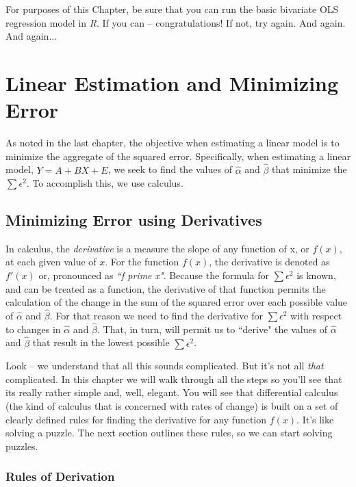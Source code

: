 \documentclass[11pt,openany]{book}\usepackage[]{graphicx}\usepackage[]{color}
\begin{document}
For purposes of this Chapter, be sure that you can run the basic bivariate OLS regression model in \textit{R}. If you can -- congratulations! If not, try again. And again. And again...




\chapter{Linear Estimation and Minimizing Error} 

As noted in the last chapter, the objective when estimating a linear model is to minimize the aggregate of the squared error. Specifically, when estimating a linear model, $Y=A+BX+E$, we seek to find the values of $\hat{\alpha}$ and $\hat{\beta}$ that minimize the $\sum \epsilon^{2}$. To accomplish this, we use calculus. 

\section{Minimizing Error using Derivatives}

In calculus, the \textit{derivative} is a measure the slope of any function of x, or $f(x)$, at each given value of $x$. For the function $f(x)$, the derivative is denoted as $f'(x)$ or, pronounced as \textit{``f prime x"}. Because the formula for $\sum \epsilon^{2}$ is known, and can be treated as a function, the derivative of that function permits the calculation of the change in the sum of the squared error over each possible value of $\hat{\alpha}$ and $\hat{\beta}$. For that reason we need to find the derivative for $\sum \epsilon^{2}$ with respect to changes in $\hat{\alpha}$ and $\hat{\beta}$. That, in turn, will permit us to ``derive" the values of $\hat{\alpha}$ and $\hat{\beta}$ that result in the lowest possible $\sum \epsilon^{2}$.

Look -- we understand that all this sounds complicated. But it's not all \textit{that} complicated. In this chapter we will walk through all the steps so you'll see that its really rather simple and, well, elegant. You will see that differential calculus (the kind of calculus that is concerned with rates of change) is built on a set of clearly defined rules for finding the derivative for any function $f(x)$. It's like solving a puzzle. The next section outlines these rules, so we can start solving puzzles. 

\subsection{Rules of Derivation} 
\end{document}
